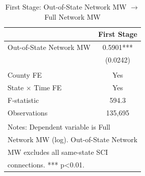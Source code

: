 \begin{table}[!h]
\centering
\caption{\label{tab:firststage}First Stage: Out-of-State Network MW $\rightarrow$ Full Network MW}
\centering
\begin{tabular}[t]{lc}
\toprule
  & First Stage\\
\midrule
Out-of-State Network MW & 0.5901***\\
 & (0.0242)\\
 & \\
County FE & Yes\\
State $\times$ Time FE & Yes\\
\addlinespace
F-statistic & 594.3\\
Observations & 135,695\\
\bottomrule
\multicolumn{2}{l}{\textsuperscript{} Notes: Dependent variable is Full}\\
\multicolumn{2}{l}{Network MW (log). Out-of-State Network}\\
\multicolumn{2}{l}{MW excludes all same-state SCI}\\
\multicolumn{2}{l}{connections. *** p<0.01.}\\
\end{tabular}
\end{table}
